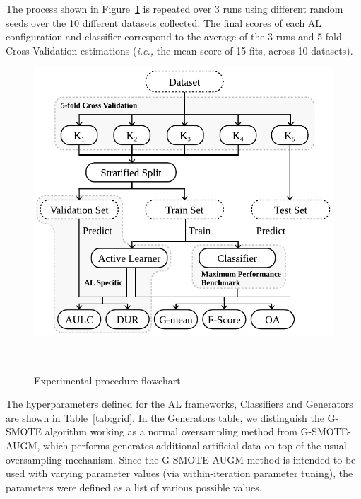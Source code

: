 \documentclass[parskip=full]{scrartcl}
\begin{document}
The process shown in Figure~\ref{fig:experimental_procedure} is repeated over
3 runs using different random seeds over the 10 different datasets collected.
The final scores of each AL configuration and classifier correspond to the
average of the 3 runs and 5-fold Cross Validation estimations (\textit{i.e.,}
the mean score of 15 fits, across 10 datasets).

\begin{figure}[H]
	\centering
	\includegraphics[width=.6\linewidth]{../analysis/experimental_procedure}
    \caption{%
        Experimental procedure flowchart.
    }~\label{fig:experimental_procedure}
\end{figure}

The hyperparameters defined for the AL frameworks, Classifiers and Generators
are shown in Table~\ref{tab:grid}. In the Generators table, we distinguish the
G-SMOTE algorithm working as a normal oversampling method from G-SMOTE-AUGM,
which performs generates additional artificial data on top of the usual
oversampling mechanism. Since the G-SMOTE-AUGM method is intended to be used
with varying parameter values (via within-iteration parameter tuning), the
parameters were defined as a list of various possible values.
\end{document}

